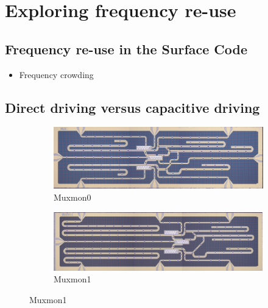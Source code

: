   \chapter{Exploring frequency re-use}
    \label{ch:Muxmon chip architecture}

    \section{Frequency re-use in the Surface Code}
      \label{sec:Frequency re-use in the Surface Code}
      \begin{itemize}
        \item Frequency crowding
      \end{itemize}


    \section{Direct driving versus capacitive driving}
      \label{sec:Muxmon0 vs Muxmon1}

      \begin{figure}[h]
      \centering
        \begin{subfigure}[b]{0.9\textwidth}
          \includegraphics[width=1\linewidth]{../Figures/MUX_0.jpg}
          \caption{Muxmon0}
          \label{fig:Muxmon0 image}
        \end{subfigure}

        \begin{subfigure}[b]{0.9\textwidth}
          \includegraphics[width=1\linewidth]{../Figures/MUX_1.jpg}
          \caption{Muxmon1}
          \label{fig:Muxmon1 image}
        \end{subfigure}
        \label{fig:Muxmon0 and Muxmon1}
      \end{figure}

